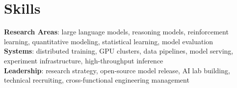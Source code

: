 \documentclass[letterpaper,10pt]{article}
\begin{document}
\section{Skills}
\begin{itemize}[leftmargin=0.15in, label={}]
  \small{\item{
    \textbf{Research Areas}{: large language models, reasoning models, reinforcement learning, quantitative modeling, statistical learning, model evaluation} \\
    \textbf{Systems}{: distributed training, GPU clusters, data pipelines, model serving, experiment infrastructure, high-throughput inference} \\
    \textbf{Leadership}{: research strategy, open-source model release, AI lab building, technical recruiting, cross-functional engineering management}
  }}
\end{itemize}
\end{document}
